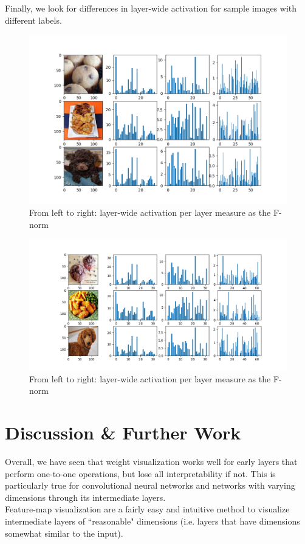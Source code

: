 \documentclass[12pt]{article}
\begin{document}
Finally, we look for differences in layer-wide activation for sample images with different labels.

\begin{figure}[H]
\centering
\includegraphics[width=0.7\linewidth]{../diagrams/layeracts3}
\caption{From left to right: layer-wide activation per layer measure as the F-norm}
\label{fig:layeracts3}
\end{figure}
\begin{figure}[H]
\centering
\includegraphics[width=0.7\linewidth]{../diagrams/layeracts1}
\caption{From left to right: layer-wide activation per layer measure as the F-norm}
\label{fig:layeracts1}
\end{figure}


\section{Discussion \& Further Work}

Overall, we have seen that weight visualization works well for early layers that perform one-to-one operations, but lose all interpretability if not. This is particularly true for convolutional neural networks and networks with varying dimensions through its intermediate layers. \\

Feature-map visualization are a fairly easy and intuitive method to visualize intermediate layers of ``reasonable" dimensions (i.e. layers that have dimensions somewhat similar to the input). \\
\end{document}
